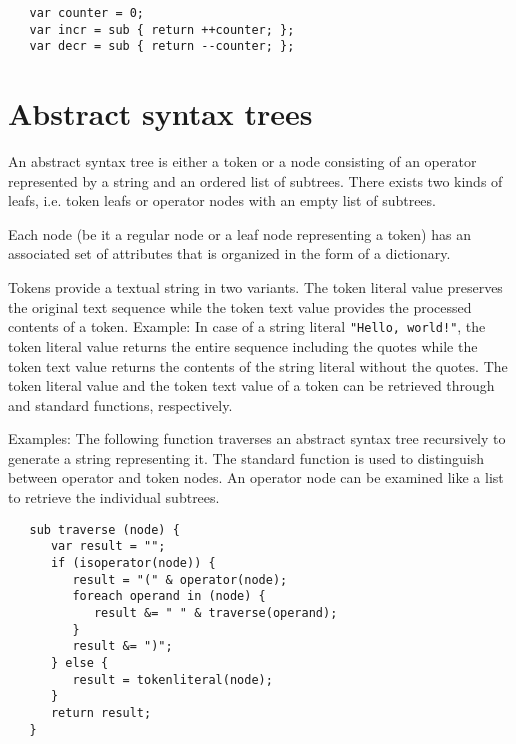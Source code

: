 \begin{lstlisting}
   var counter = 0;
   var incr = sub { return ++counter; };
   var decr = sub { return --counter; };
\end{lstlisting}

\section{Abstract syntax trees}

\label{ast}
An abstract syntax tree is either a token or a
node consisting of an operator
represented by a string and an ordered list of subtrees.
There exists two kinds of leafs, i.e. token
leafs or operator nodes with an empty list of subtrees.

Each node (be it a regular node or a leaf node representing a token)
has an associated set of attributes that is organized in the form
of a dictionary.

Tokens provide a textual string in two variants. The token
literal value preserves the original
text sequence while the token text value
provides the processed contents of a token. Example: In case of a
string literal \lstinline+"Hello, world!"+, the token literal value
returns the entire sequence including the quotes while the token
text value returns the contents of the string literal without the
quotes. The token literal value and the token text value of a token
can be retrieved through  and
 standard functions, respectively.

Examples: The following function  traverses an
abstract syntax tree recursively to generate a string representing it.
The standard function  is used to distinguish between
operator and token nodes. An operator node can be examined like a list
to retrieve the individual subtrees.

\begin{lstlisting}
   sub traverse (node) {
      var result = "";
      if (isoperator(node)) {
         result = "(" & operator(node);
         foreach operand in (node) {
            result &= " " & traverse(operand);
         }
         result &= ")";
      } else {
         result = tokenliteral(node);
      }
      return result;
   }
\end{lstlisting}

